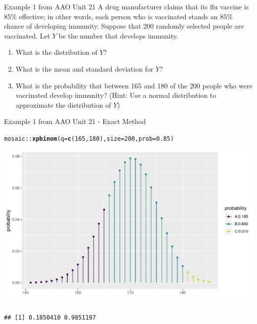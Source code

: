 \documentclass[handout]{beamer}\usepackage[]{graphicx}\usepackage[]{color}
\newcommand{\hlnum}[1]{\textcolor[rgb]{0.686,0.059,0.569}{#1}}%
\newcommand{\hlopt}[1]{\textcolor[rgb]{0,0,0}{#1}}%
\newcommand{\hlstd}[1]{\textcolor[rgb]{0.345,0.345,0.345}{#1}}%
\newcommand{\hlkwc}[1]{\textcolor[rgb]{0.333,0.667,0.333}{#1}}%
\newcommand{\hlkwd}[1]{\textcolor[rgb]{0.737,0.353,0.396}{\textbf{#1}}}%
\newenvironment{knitrout}{}{} %
\begin{document}
\begin{frame}{Example 1 from AAO Unit 21}
A drug manufacturer claims that its flu vaccine is 85\% effective; in other words, each person who is vaccinated stands an 85\% chance of developing immunity. Suppose that 200 randomly selected people are vaccinated. Let $Y$ be the number that develops immunity.

\begin{enumerate}
	\item What is the distribution of $Y$?
\item What is the mean and standard deviation for $Y$?
\item What is the probability that between 165 and 180 of the 200 people who were vaccinated
develop immunity? (Hint: Use a normal distribution to approximate the distribution of $Y$)
\end{enumerate}
\end{frame}


\begin{frame}[fragile]{Example 1 from AAO Unit 21 - Exact Method}

\begin{knitrout}\scriptsize
{}\color{fgcolor}
\begin{alltt}
\hlstd{mosaic}\hlopt{::}\hlkwd{xpbinom}\hlstd{(}\hlkwc{q} \hlstd{=} \hlkwd{c}\hlstd{(}\hlnum{165}\hlstd{,} \hlnum{180}\hlstd{),} \hlkwc{size} \hlstd{=} \hlnum{200}\hlstd{,} \hlkwc{prob} \hlstd{=} \hlnum{0.85}\hlstd{)}
\end{alltt}


{\centering \includegraphics[width=1\linewidth]{figure/unnamed-chunk-6-1} 

}


\begin{verbatim}
## [1] 0.1850410 0.9851197
\end{verbatim}

\end{knitrout}
\end{frame}
\end{document}
